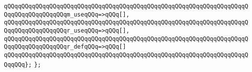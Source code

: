 \verb|qQQqqQQqqQQqqQQqqQQqqQQqqQQqqQQqqQQqqQQqqQQqqQQqqQQqqQQqqQQqqQQqqQQqqQQqqQQqqQQqqQQqqQQqm_useqQQq=>qQQq[],|\newline
\verb|qQQqqQQqqQQqqQQqqQQqqQQqqQQqqQQqqQQqqQQqqQQqqQQqqQQqqQQqqQQqqQQqqQQqqQQqqQQqqQQqqQQqqQQqr_useqQQq=>qQQq[],|\newline
\verb|qQQqqQQqqQQqqQQqqQQqqQQqqQQqqQQqqQQqqQQqqQQqqQQqqQQqqQQqqQQqqQQqqQQqqQQqqQQqqQQqqQQqqQQqr_defqQQq=>qQQq[]|\newline
\verb|qQQqqQQqqQQqqQQqqQQqqQQqqQQqqQQqqQQqqQQqqQQqqQQqqQQqqQQqqQQqqQQqqQQqqQQqqQQq};|\newline
\newline
\verb|};|\newline
\newline

